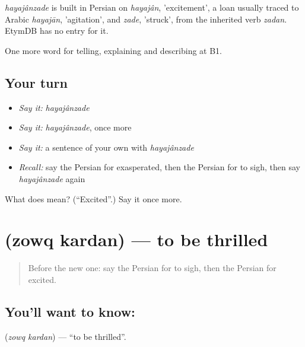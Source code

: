 \begin{cousinweb}
\emph{hayajânzade} is built in Persian on \emph{hayajân}, 'excitement', a loan usually traced to Arabic \emph{hayajān}, 'agitation', and \emph{zade}, 'struck', from the inherited verb \emph{zadan}. EtymDB has no entry for it.
\end{cousinweb}

\begin{grammarlens}[title={What you've built}]
One more word for telling, explaining and describing at B1.
\end{grammarlens}

\subsection*{Your turn}
\begin{itemize}
\raggedright
  \item \emph{Say it:} \emph{hayajânzade}
  \item \emph{Say it:} \emph{hayajânzade}, once more
  \item \emph{Say it:} a sentence of your own with \emph{hayajânzade}
  \item \emph{Recall:} say the Persian for exasperated, then the Persian for to sigh, then say \emph{hayajânzade} again
\end{itemize}

\begin{tcolorbox}[breakable,colback=teal!4,colframe=teal!35!black,title={Before you move on}]
What does   mean? (\textquotedblleft{}Excited\textquotedblright{}.) Say it once more.
\end{tcolorbox}
\section[\texorpdfstring{\fa{ذوق} \fa{کردن} (zowq kardan)}{ذوق کردن (zowq kardan)}]{  (zowq kardan) — to be thrilled}

\label{lesson:FA-C486-zoq-kardan}



\begin{quote}
Before the new one: say the Persian for to sigh, then the Persian for excited.
\end{quote}

\subsection*{You'll want to know:  }
\textbf{ } (\emph{zowq kardan}) — \textquotedblleft{}to be thrilled\textquotedblright{}.

